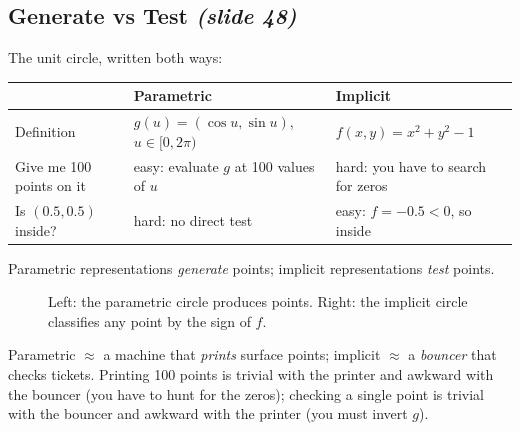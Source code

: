 \documentclass[11pt,a4paper]{article}
\theoremstyle{definition}
\theoremstyle{plain}
\theoremstyle{remark}
\newcommand{\slides}[1]{\texorpdfstring{\emph{(#1)}}{(#1)}}
\begin{document}
\subsection{Generate vs Test \slides{slide 48}}
The unit circle, written both ways:
\begin{center}
\begin{tabular}{L{3.2cm}L{5.4cm}L{5.4cm}}
\toprule
 & \textbf{Parametric} & \textbf{Implicit}\\
\midrule
Definition & $g(u)=(\cos u,\sin u)$, $u\in[0,2\pi)$ & $f(x,y)=x^2+y^2-1$\\
Give me 100 points on it & easy: evaluate $g$ at 100 values of $u$ & hard: you have to search for zeros\\
Is $(0.5,0.5)$ inside? & hard: no direct test & easy: $f=-0.5<0$, so inside\\
\bottomrule
\end{tabular}
\end{center}
Parametric representations \emph{generate} points; implicit representations \emph{test} points.

\begin{figure}[ht]
\centering
{}
\caption{Left: the parametric circle produces points. Right: the implicit circle classifies any point by the sign of $f$.}
\end{figure}

\begin{intuition}
Parametric $\approx$ a machine that \emph{prints} surface points; implicit $\approx$ a \emph{bouncer} that checks tickets. Printing 100 points is trivial with the printer and awkward with the bouncer (you have to hunt for the zeros); checking a single point is trivial with the bouncer and awkward with the printer (you must invert $g$).
\end{intuition}
\end{document}
